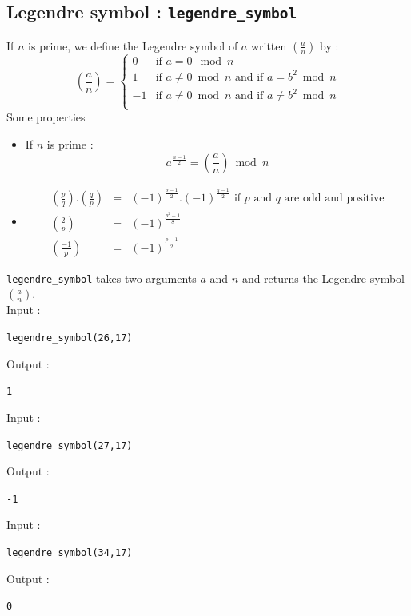 \documentclass[a4paper,11pt]{book}
\begin{document}
\subsection{Legendre symbol : {\tt legendre\_symbol}}
If $n$ is prime, we define the Legendre symbol of $a$ 
written $\left(\frac{a}{n}\right)$ by :\\
$$\left(\frac{a}{n}\right)=\left\{\begin{array}{rl}
0 & \mbox{if }a=0\ \bmod n \\
1 & \mbox{if } a \neq 0 \bmod n \mbox{ and if } a=b^2 \bmod n\\
-1 & \mbox{if } a \neq 0 \bmod n \mbox{ and if } a \neq b^2 \bmod n\\
\end{array}
\right.$$
Some properties
\begin{itemize}
\item
If $n$ is prime :
\[ a^{\frac{n-1}{2}}=\left(\frac{a}{n}\right) \bmod n \]
\item
\begin{eqnarray*}
\left(\frac{p}{q}\right).\left(\frac{q}{p}\right)
&=&(-1)^{\frac{p-1}{2}}.(-1)^{\frac{q-1}{2}}
\mbox{ if $p$ and $q$ are odd and positive} \\
\left(\frac{2}{p}\right)&=&(-1)^{\frac{p^2-1}{8}} \\
\left(\frac{-1}{p}\right)&=&(-1)^{\frac{p-1}{2}}
\end{eqnarray*}
\end{itemize}
{\tt legendre\_symbol} takes two arguments $a$ and $n$ and returns the Legendre
symbol $\left(\frac{a}{n}\right)$.\\
Input :
\begin{center}{\tt legendre\_symbol(26,17)}\end{center}
Output :
\begin{center}{\tt 1}\end{center}
Input :
\begin{center}{\tt legendre\_symbol(27,17)}\end{center}
Output :
\begin{center}{\tt -1}\end{center}
Input :
\begin{center}{\tt legendre\_symbol(34,17)}\end{center}
Output :
\begin{center}{\tt 0}\end{center}
\end{document}

